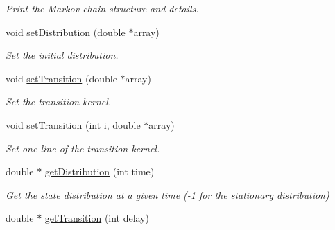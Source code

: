 \begin{DoxyCompactItemize}
\begin{DoxyCompactList}\small\item\em Print the Markov chain structure and details. \end{DoxyCompactList}\item 
void \hyperlink{class_markov_process_a2942db4262f73c20cc49bfebaf0df101}{set\-Distribution} (double $\ast$array)
\begin{DoxyCompactList}\small\item\em Set the initial distribution. \end{DoxyCompactList}\item 
void \hyperlink{class_markov_process_a687c9c983ac090f2ba40d028c6f04786}{set\-Transition} (double $\ast$array)
\begin{DoxyCompactList}\small\item\em Set the transition kernel. \end{DoxyCompactList}\item 
void \hyperlink{class_markov_process_a4e7f19999ca3e6972507b9e0975f1b6b}{set\-Transition} (int i, double $\ast$array)
\begin{DoxyCompactList}\small\item\em Set one line of the transition kernel. \end{DoxyCompactList}\item 
\hypertarget{class_markov_process_afa7edaa775112df8dd4fc5007034d7e7}{double $\ast$ \hyperlink{class_markov_process_afa7edaa775112df8dd4fc5007034d7e7}{get\-Distribution} (int time)}\label{class_markov_process_afa7edaa775112df8dd4fc5007034d7e7}

\begin{DoxyCompactList}\small\item\em Get the state distribution at a given time (-\/1 for the stationary distribution) \end{DoxyCompactList}\item 
\hypertarget{class_markov_process_a39c87840da9b238d7c33bd5ad23d538d}{double $\ast$ \hyperlink{class_markov_process_a39c87840da9b238d7c33bd5ad23d538d}{get\-Transition} (int delay)}\label{class_markov_process_a39c87840da9b238d7c33bd5ad23d538d}


\end{DoxyCompactItemize}
